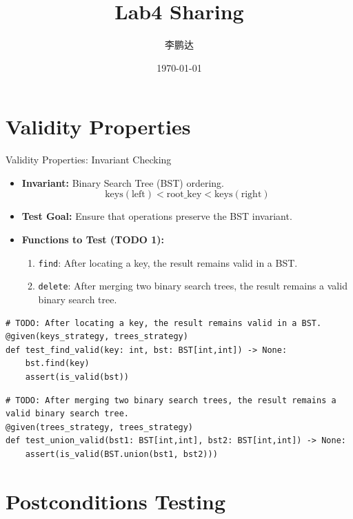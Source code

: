 \documentclass{beamer}
\title{Lab4 Sharing}
\author{李鹏达}
\date{\today}
\begin{document}
\frame{\titlepage}

\section{Validity Properties}

\begin{frame}{Validity Properties: Invariant Checking}
    \begin{itemize}
        \item \textbf{Invariant:} Binary Search Tree (BST) ordering.
        $$ \text{keys}(\text{left}) < \text{root\_key} < \text{keys}(\text{right}) $$
        \item \textbf{Test Goal:} Ensure that operations preserve the BST invariant.
        \item \textbf{Functions to Test (TODO 1):}
        \begin{enumerate}
            \item \texttt{find}: After locating a key, the result remains valid in a BST.
            \item \texttt{delete}: After merging two binary search trees, the result remains a valid binary search tree.
        \end{enumerate}
    \end{itemize}

    \framebreak

    \begin{lstlisting}
# TODO: After locating a key, the result remains valid in a BST.
@given(keys_strategy, trees_strategy)
def test_find_valid(key: int, bst: BST[int,int]) -> None:
    bst.find(key)
    assert(is_valid(bst))
    \end{lstlisting}

    \begin{lstlisting}
# TODO: After merging two binary search trees, the result remains a valid binary search tree.
@given(trees_strategy, trees_strategy)
def test_union_valid(bst1: BST[int,int], bst2: BST[int,int]) -> None:
    assert(is_valid(BST.union(bst1, bst2)))
    \end{lstlisting}

\end{frame}

\section{Postconditions Testing}
\end{document}

